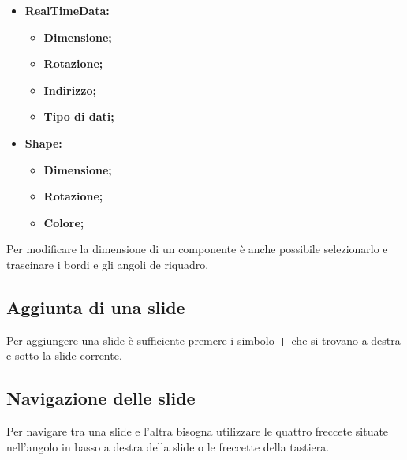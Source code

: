 \begin{itemize}
	\item \textbf{RealTimeData:}
		\begin{itemize}
			\item \textbf{Dimensione;}
			\item \textbf{Rotazione;}
			\item \textbf{Indirizzo;}
			\item \textbf{Tipo di dati;}
		\end{itemize}
		
	\item \textbf{Shape:}
		\begin{itemize}
			\item \textbf{Dimensione;}
			\item \textbf{Rotazione;}
			\item \textbf{Colore;}
		\end{itemize}
\end{itemize}

\noindent Per modificare la dimensione di un componente è anche possibile selezionarlo e trascinare i bordi e gli angoli de riquadro.

\subsection{Aggiunta di una slide}
Per aggiungere una slide è sufficiente premere i simbolo \textbf{+} che si trovano a destra e sotto la slide corrente.

\subsection{Navigazione delle slide}
Per navigare tra una slide e l'altra bisogna utilizzare le quattro freccete situate nell'angolo in basso a destra della slide o le freccette della tastiera.